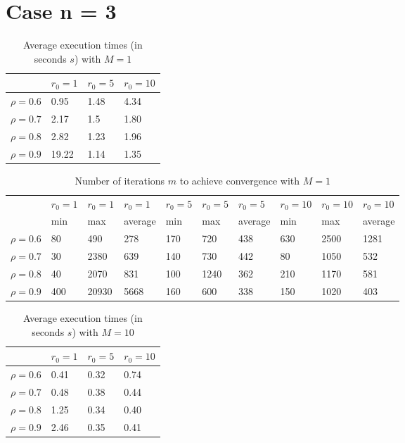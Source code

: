 \documentclass[a4paper,11pt,openright]{report}
\begin{document}
\section*{Case n = 3}  
\begin{table}[H]
\centering
\addtolength{\leftskip}{-1.5cm}
\addtolength{\rightskip}{-1.5cm}
\begin{tabular}{|c|lll|}
\hline
$ $ & $r_0 = 1$ & $r_0 = 5$ & $r_0 = 10$ \\
\hline
$\rho = 0.6$ & 0.95 & 1.48 & 4.34 \\

$\rho = 0.7$ & 2.17 & 1.5 & 1.80 \\

$\rho = 0.8$ & 2.82 & 1.23 & 1.96 \\

$\rho = 0.9$ & 19.22 & 1.14 & 1.35 \\
\hline
\end{tabular}
\caption{Average execution
 times (in seconds $s$) with $M = 1$}
\end{table}
\begin{table}[H]
\centering
\addtolength{\leftskip}{-1.5cm}
\addtolength{\rightskip}{-1.5cm}
\begin{tabular}{|c|lllllllll|}
\hline
$ $ & $r_0 = 1$ & $r_0 = 1$ & $r_0 = 1$ & $r_0 = 5$ & $r_0 = 5$ & $r_0 = 5$ & $r_0 = 10$ & $r_0 = 10$ & $r_0 = 10$  \\
$ $ & min & max & average & min & max & average & min & max & average \\ 
\hline
$\rho = 0.6$ & 80 & 490 & 278 & 170 & 720 & 438 & 630 & 2500 & 1281 \\

$\rho = 0.7$ & 30 & 2380 & 639 & 140 & 730 & 442 & 80 & 1050 & 532\\

$\rho = 0.8$ & 40 & 2070 & 831 & 100 & 1240 & 362 & 210 & 1170 & 581\\

$\rho = 0.9$ & 400 & 20930 & 5668 & 160 & 600 & 338 & 150 & 1020 & 403\\
\hline
\end{tabular}
\caption{Number of iterations $m$ to achieve convergence with $M = 1$}
\end{table}
\begin{table}[H]
\centering
\addtolength{\leftskip}{-1.5cm}
\addtolength{\rightskip}{-1.5cm}
\begin{tabular}{|c|lll|}
\hline
$ $ & $r_0 = 1$ & $r_0 = 5$ & $r_0 = 10$ \\
\hline
$\rho = 0.6$ & 0.41 & 0.32 & 0.74 \\

$\rho = 0.7$ & 0.48 & 0.38 & 0.44 \\

$\rho = 0.8$ & 1.25 & 0.34 & 0.40 \\

$\rho = 0.9$ & 2.46 & 0.35 & 0.41 \\
\hline
\end{tabular}
\caption{Average execution
 times (in seconds $s$) with $M = 10$}
\end{table}
\end{document}

